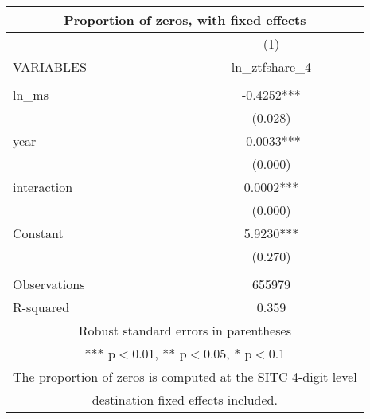 \begin{tabular}{lc}
\multicolumn{2}{c}{Proportion of zeros, with fixed effects} \\ \hline
 & (1) \\
VARIABLES & ln\_ztfshare\_4 \\ \hline
 &  \\
ln\_ms & -0.4252*** \\
 & (0.028) \\
year & -0.0033*** \\
 & (0.000) \\
interaction & 0.0002*** \\
 & (0.000) \\
Constant & 5.9230*** \\
 & (0.270) \\
 &  \\
Observations & 655979 \\
 R-squared & 0.359 \\ \hline
\multicolumn{2}{c}{ Robust standard errors in parentheses} \\
\multicolumn{2}{c}{ *** p$<$0.01, ** p$<$0.05, * p$<$0.1} \\
\multicolumn{2}{c}{ The proportion of zeros is computed at the SITC 4-digit level} \\
\multicolumn{2}{c}{ destination fixed effects included.} \\
\end{tabular}
